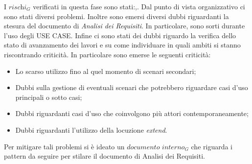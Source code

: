 I $\textit{rischi}_G$ verificati in questa fase sono stati:,.
Dal punto di vista organizzativo ci sono stati diversi problemi. Inoltre sono emersi diversi dubbi riguardanti la stesura del documento di \emph{Analisi dei Requisiti}.
In particolare, sono sorti durante l'uso degli USE CASE. Infine ci sono stati dei dubbi riguardo la verifica dello stato di avanzamento dei lavori e su come individuare in quali ambiti si stanno riscontrando criticità.
In particolare sono emerse le seguenti criticità:
\begin{itemize}
    \item Lo scarso utilizzo fino al quel momento di scenari secondari;
    \item Dubbi sulla gestione di eventuali scenari che potrebbero riguardare casi d’uso principali o sotto casi;
    \item Dubbi riguardanti casi d’uso che coinvolgono più attori contemporaneamente;
    \item Dubbi riguardanti l'utilizzo della locuzione \emph{extend}.
\end{itemize}
Per mitigare tali problemi si è ideato un $\textit{documento interno}_G$ che riguarda i pattern da seguire per stilare il documento di Analisi dei Requisiti.